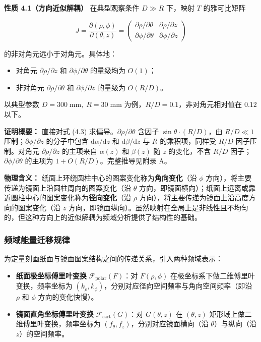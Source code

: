 \documentclass[12pt,a4paper]{ctexart}
\begin{document}
\textbf{性质 4.1（方向近似解耦）} 在典型观察条件 $D\gg R$ 下，映射 $T$ 的雅可比矩阵

\[
J = \frac{\partial(\rho,\phi)}{\partial(\theta,z)} =
\begin{pmatrix}
\partial\rho/\partial\theta & \partial\rho/\partial z \\
\partial\phi/\partial\theta & \partial\phi/\partial z
\end{pmatrix}
\]

的非对角元远小于对角元。具体地：
\begin{itemize}
    \item 对角元 $\partial\rho/\partial z$ 和 $\partial\phi/\partial\theta$ 的量级均为 $O(1)$；
    \item 非对角元 $\partial\rho/\partial\theta$ 和 $\partial\phi/\partial z$ 的量级为 $O(R/D)$。
\end{itemize}
以典型参数 $D=300\;\mathrm{mm},\;R=30\;\mathrm{mm}$ 为例，$R/D=0.1$，非对角元相对值在 $0.12$ 以下。

\textbf{证明概要：} 直接对式 (4.3) 求偏导。$\partial\rho/\partial\theta$ 含因子 $\sin\theta\cdot(R/D)$，由 $R/D\ll1$ 压制；$\partial\phi/\partial z$ 的分子中包含 $\mathrm{d}\alpha/\mathrm{d}z$ 和 $\mathrm{d}\beta/\mathrm{d}z$ 与 $R$ 的乘积项，同样受 $R/D$ 因子压制。对角元 $\partial\rho/\partial z$ 的主项来自 $\alpha(z)$ 和 $\beta(z)$ 随 $z$ 的变化，不含 $R/D$ 因子；$\partial\phi/\partial\theta$ 的主项为 $1+O(R/D)$。完整推导见附录 A。

\textbf{物理含义：} 纸面上环绕圆柱中心的图案变化称为\textbf{角向变化}（沿 $\phi$ 方向），将主要传递为镜面上沿圆柱周向的图案变化（沿 $\theta$ 方向，即镜面横向）；纸面上远离或靠近圆柱中心的图案变化称为\textbf{径向变化}（沿 $\rho$ 方向），将主要传递为镜面上沿高度方向的图案变化（沿 $z$ 方向，即镜面纵向）。虽然映射在全局上是非线性且不均匀的，但这种方向上的近似解耦为频域分析提供了结构性的基础。

\subsubsection{频域能量迁移规律}

为定量刻画纸面与镜面图案结构之间的传递关系，引入两种频域表示：

\begin{itemize}
    \item \textbf{纸面极坐标傅里叶变换} $\mathcal{F}_{\mathrm{polar}}(F)$：对 $F(\rho,\phi)$ 在极坐标系下做二维傅里叶变换，频率坐标为 $(k_\rho,k_\phi)$，分别对应径向空间频率与角向空间频率（即沿 $\rho$ 和 $\phi$ 方向的变化快慢）。
    \item \textbf{镜面直角坐标傅里叶变换} $\mathcal{F}_{\mathrm{cart}}(G)$：对 $G(\theta,z)$ 在 $(\theta,z)$ 矩形域上做二维傅里叶变换，频率坐标为 $(f_\theta,f_z)$，分别对应镜面横向（沿 $\theta$）与纵向（沿 $z$）的空间频率。
\end{itemize}
\end{document}
